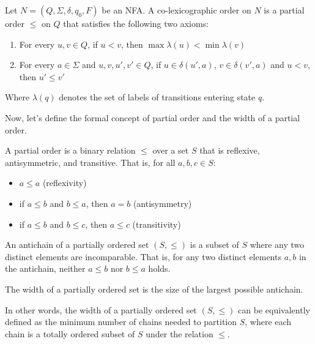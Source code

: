 \begin{definition} \label{def:colex_order_on_automaton}
    Let $N = (Q, \Sigma, \delta, q_0, F)$ be an NFA. A co-lexicographic order on $N$ is a partial order $\leq$ on $Q$ that satisfies the following two axioms:
    \begin{enumerate}[leftmargin=25pt]
        \item For every $u, v \in Q$, if $u < v$, then $\max\lambda(u) < \min\lambda(v)$
        \item For every $a \in \Sigma$ and $u, v, u', v' \in Q$, if $u \in \delta(u', a)$, $v \in \delta(v', a)$ and $u < v$, then $u' \leq v'$
    \end{enumerate}
\end{definition}
Where $\lambda(q)$ denotes the set of labels of transitions entering state $q$.

Now, let's define the formal concept of partial order and the width of a partial order. 
\begin{definition}
    A partial order is a binary relation $\leq$ over a set $S$ that is reflexive, antisymmetric, and transitive. That is, for all $a, b, c \in S$:
    \begin{itemize}[leftmargin=25pt]
        \item $a \leq a$ (reflexivity)
        \item if $a \leq b$ and $b \leq a$, then $a = b$ (antisymmetry)
        \item if $a \leq b$ and $b \leq c$, then $a \leq c$ (transitivity)
    \end{itemize}
\end{definition}

\begin{definition}[Antichain]
    An antichain of a partially ordered set $(S, \leq)$ is a subset of $S$ where any two distinct elements are incomparable. That is, for any two distinct elements $a, b$ in the antichain, neither $a \leq b$ nor $b \leq a$ holds.
\end{definition}

\begin{definition}[Width]
    The width of a partially ordered set is the size of the largest possible antichain.
\end{definition}
In other words, the width of a partially ordered set $(S, \leq)$ can be equivalently defined as the minimum number of chains needed to partition $S$, where each chain is a totally ordered subset of $S$ under the relation $\leq$.

